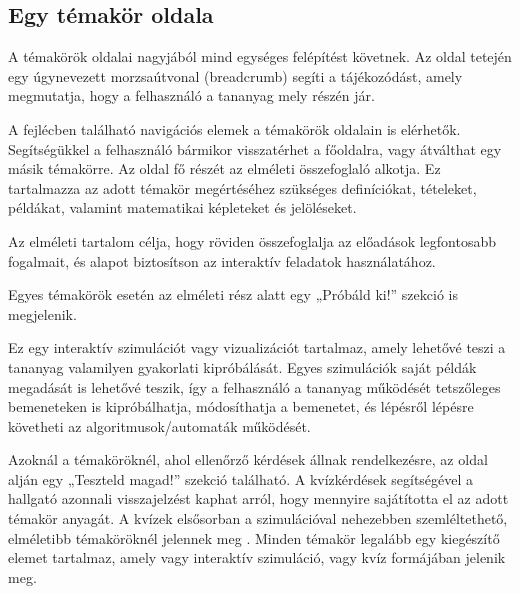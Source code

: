 \begin{itemize}
\subsection{Egy témakör oldala}

A témakörök oldalai nagyjából mind egységes felépítést követnek.
Az oldal tetején egy úgynevezett morzsaútvonal (breadcrumb) segíti a tájékozódást,
 amely megmutatja, hogy a felhasználó a tananyag mely részén jár.
 
A fejlécben található navigációs elemek a témakörök oldalain is elérhetők.
 Segítségükkel a felhasználó bármikor visszatérhet a főoldalra, vagy átválthat egy másik témakörre.
Az oldal fő részét az elméleti összefoglaló alkotja. 
Ez tartalmazza az adott témakör megértéséhez szükséges definíciókat, tételeket, példákat, valamint matematikai képleteket és jelöléseket.

Az elméleti tartalom célja, hogy röviden összefoglalja az előadások legfontosabb fogalmait, és alapot biztosítson az interaktív feladatok használatához.

Egyes témakörök esetén az elméleti rész alatt egy „Próbáld ki!” szekció is megjelenik.

Ez egy interaktív szimulációt vagy vizualizációt tartalmaz, amely lehetővé teszi a tananyag valamilyen gyakorlati kipróbálását.
Egyes szimulációk saját példák megadását is lehetővé teszik, így a felhasználó a tananyag működését tetszőleges bemeneteken is kipróbálhatja, módosíthatja a bemenetet, és lépésről lépésre követheti az algoritmusok/automaták működését.

Azoknál a témaköröknél, ahol ellenőrző kérdések állnak rendelkezésre, az oldal alján egy „Teszteld magad!” szekció található. A kvízkérdések segítségével a hallgató azonnali visszajelzést kaphat arról, hogy mennyire sajátította el az adott témakör anyagát.
A kvízek elsősorban a szimulációval nehezebben szemléltethető, elméletibb témaköröknél jelennek meg
. Minden témakör legalább egy kiegészítő elemet tartalmaz, amely vagy interaktív szimuláció, vagy kvíz formájában jelenik meg.



\end{itemize}
